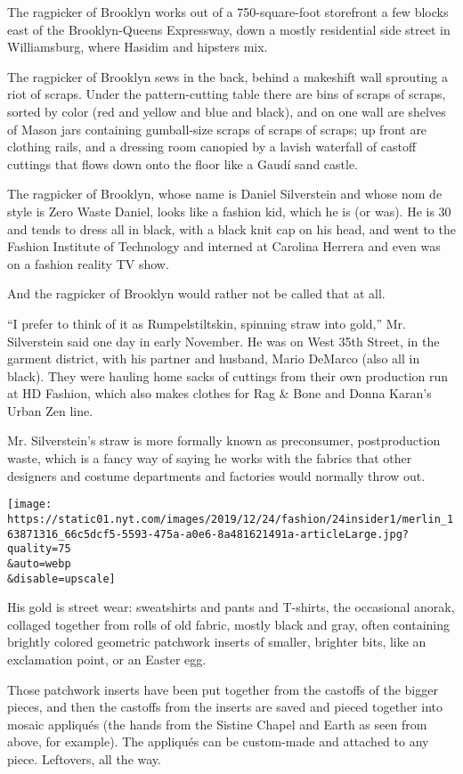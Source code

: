 The ragpicker of Brooklyn works out of a 750-square-foot storefront a
few blocks east of the Brooklyn-Queens Expressway, down a mostly
residential side street in Williamsburg, where Hasidim and hipsters mix.

The ragpicker of Brooklyn sews in the back, behind a makeshift wall
sprouting a riot of scraps. Under the pattern-cutting table there are
bins of scraps of scraps, sorted by color (red and yellow and blue and
black), and on one wall are shelves of Mason jars containing
gumball-size scraps of scraps of scraps; up front are clothing rails,
and a dressing room canopied by a lavish waterfall of castoff cuttings
that flows down onto the floor like a Gaudí sand castle.

The ragpicker of Brooklyn, whose name is Daniel Silverstein and whose
nom de style is Zero Waste Daniel, looks like a fashion kid, which he is
(or was). He is 30 and tends to dress all in black, with a black knit
cap on his head, and went to the Fashion Institute of Technology and
interned at Carolina Herrera and even was on a fashion reality TV show.

And the ragpicker of Brooklyn would rather not be called that at all.

``I prefer to think of it as Rumpelstiltskin, spinning straw into
gold,'' Mr. Silverstein said one day in early November. He was on West
35th Street, in the garment district, with his partner and husband,
Mario DeMarco (also all in black). They were hauling home sacks of
cuttings from their own production run at HD Fashion, which also makes
clothes for Rag \& Bone and Donna Karan's Urban Zen line.

Mr. Silverstein's straw is more formally known as preconsumer,
postproduction waste, which is a fancy way of saying he works with the
fabrics that other designers and costume departments and factories would
normally throw out.

\texttt{[image: https://static01.nyt.com/images/2019/12/24/fashion/24insider1/merlin\_163871316\_66c5dcf5-5593-475a-a0e6-8a481621491a-articleLarge.jpg?quality=75\\\&auto=webp\\\&disable=upscale]}

His gold is street wear: sweatshirts and pants and T-shirts, the
occasional anorak, collaged together from rolls of old fabric, mostly
black and gray, often containing brightly colored geometric patchwork
inserts of smaller, brighter bits, like an exclamation point, or an
Easter egg.

Those patchwork inserts have been put together from the castoffs of the
bigger pieces, and then the castoffs from the inserts are saved and
pieced together into mosaic appliqués (the hands from the Sistine Chapel
and Earth as seen from above, for example). The appliqués can be
custom-made and attached to any piece. Leftovers, all the way.

